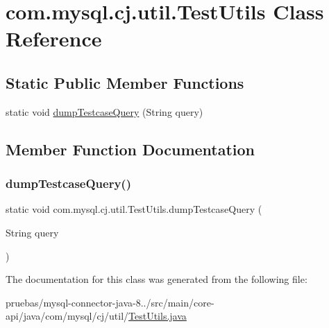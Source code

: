 \hypertarget{classcom_1_1mysql_1_1cj_1_1util_1_1_test_utils}{}\section{com.\+mysql.\+cj.\+util.\+Test\+Utils Class Reference}
\label{classcom_1_1mysql_1_1cj_1_1util_1_1_test_utils}
\subsection*{Static Public Member Functions}
\begin{DoxyCompactItemize}
\item 
static void \mbox{\hyperlink{classcom_1_1mysql_1_1cj_1_1util_1_1_test_utils_a5922a7ed071bc09b6b3e837ee8c33cbb}{dump\+Testcase\+Query}} (String query)
\end{DoxyCompactItemize}


\subsection{Member Function Documentation}
\mbox{\label{classcom_1_1mysql_1_1cj_1_1util_1_1_test_utils_a5922a7ed071bc09b6b3e837ee8c33cbb}} 
\subsubsection{\texorpdfstring{dump\+Testcase\+Query()}{dumpTestcaseQuery()}}
{\footnotesize\ttfamily static void com.\+mysql.\+cj.\+util.\+Test\+Utils.\+dump\+Testcase\+Query (\begin{DoxyParamCaption}\item[{String}]{query }\end{DoxyParamCaption})\hspace{0.3cm}{\ttfamily [static]}}



The documentation for this class was generated from the following file\+:\begin{DoxyCompactItemize}
\item 
pruebas/mysql-\/connector-\/java-\/8../src/main/core-\/api/java/com/mysql/cj/util/\mbox{\hyperlink{main_2core-api_2java_2com_2mysql_2cj_2util_2_test_utils_8java}{Test\+Utils.\+java}}\end{DoxyCompactItemize}
